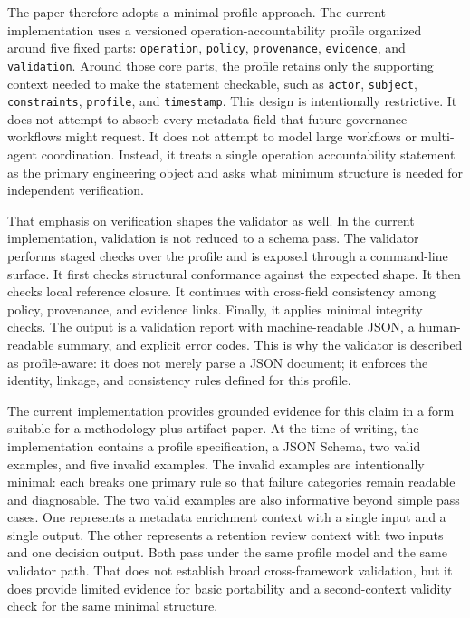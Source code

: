The paper therefore adopts a minimal-profile approach. The current implementation uses a versioned operation-accountability profile organized around five fixed parts: \texttt{operation}, \texttt{policy}, \texttt{provenance}, \texttt{evidence}, and \texttt{validation}. Around those core parts, the profile retains only the supporting context needed to make the statement checkable, such as \texttt{actor}, \texttt{subject}, \texttt{constraints}, \texttt{profile}, and \texttt{timestamp}. This design is intentionally restrictive. It does not attempt to absorb every metadata field that future governance workflows might request. It does not attempt to model large workflows or multi-agent coordination. Instead, it treats a single operation accountability statement as the primary engineering object and asks what minimum structure is needed for independent verification.

That emphasis on verification shapes the validator as well. In the current implementation, validation is not reduced to a schema pass. The validator performs staged checks over the profile and is exposed through a command-line surface. It first checks structural conformance against the expected shape. It then checks local reference closure. It continues with cross-field consistency among policy, provenance, and evidence links. Finally, it applies minimal integrity checks. The output is a validation report with machine-readable JSON, a human-readable summary, and explicit error codes. This is why the validator is described as profile-aware: it does not merely parse a JSON document; it enforces the identity, linkage, and consistency rules defined for this profile.

The current implementation provides grounded evidence for this claim in a form suitable for a methodology-plus-artifact paper. At the time of writing, the implementation contains a profile specification, a JSON Schema, two valid examples, and five invalid examples. The invalid examples are intentionally minimal: each breaks one primary rule so that failure categories remain readable and diagnosable. The two valid examples are also informative beyond simple pass cases. One represents a metadata enrichment context with a single input and a single output. The other represents a retention review context with two inputs and one decision output. Both pass under the same profile model and the same validator path. That does not establish broad cross-framework validation, but it does provide limited evidence for basic portability and a second-context validity check for the same minimal structure.

